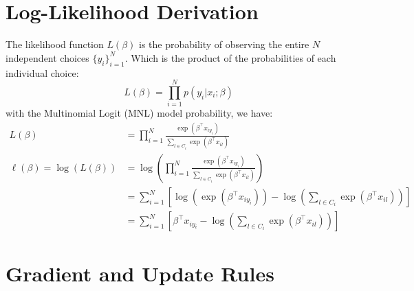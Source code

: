 \documentclass[11pt, a4paper, oneside]{memoir}
\begin{document}
\section{Log-Likelihood Derivation}
The likelihood function $L(\beta)$ is the probability of observing the entire $N$ independent choices $\{y_i\}_{i=1}^N$.
Which is the product of the probabilities of each individual choice:
\[ L(\beta) = \prod_{i=1}^N p(y_i | x_i; \beta) \]
with the Multinomial Logit (MNL) model probability, we have:
\begin{align*}
  L(\beta) &= \prod_{i=1}^{N} \frac{\exp(\beta^\top x_{iy_i})}{\sum_{l \in C_i} \exp(\beta^\top x_{il})} \\
  \ell(\beta) = \log(L(\beta)) &= \log \left( \prod_{i=1}^{N} \frac{\exp(\beta^\top x_{iy_i})}{\sum_{l \in C_i} \exp(\beta^\top x_{il})} \right) \\
  &= \sum_{i=1}^{N} \left[ \log(\exp(\beta^\top x_{iy_i})) - \log \left( \sum_{l \in C_i} \exp(\beta^\top x_{il}) \right) \right] \\
  &= \sum_{i=1}^{N} \left[ \beta^\top x_{iy_i} - \log \left( \sum_{l \in C_i} \exp(\beta^\top x_{il}) \right) \right]
\end{align*}

\section{Gradient and Update Rules}
\end{document}
